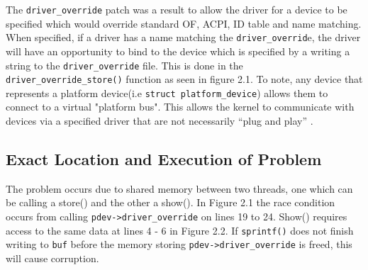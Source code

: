 \documentclass[12pt]{article}
\begin{document}
The \texttt{driver\_override} patch was a result to allow the driver for a device to be specified which would override standard OF, ACPI, ID table and name matching. When specified, if a driver has a name matching the \texttt{driver\_overrid}e, the driver will have an opportunity to bind to the device which is specified by a writing a string to the \texttt{driver\_override} file. This is done in the \texttt{driver\_override\_store()} function as seen in figure 2.1. To note, any device that represents a platform device(i.e \texttt{struct platform\_device}) allows them to connect to a virtual "platform bus". This allows the kernel to communicate with devices via a specified driver that are not necessarily ``plug and play'' \cite{source-code}.


%
%


\subsection{Exact Location and Execution of Problem}
The problem occurs due to shared memory between two threads, one which can be calling a store() and the other a show(). In Figure 2.1 the race condition occurs from calling \texttt{pdev->driver\_override} on lines 19 to 24. Show() requires access to the same data at lines 4 - 6 in Figure 2.2. If \texttt{sprintf()} does not finish writing to \texttt{buf} before the memory storing \texttt{pdev->driver\_override} is freed, this will cause corruption.
\end{document}
